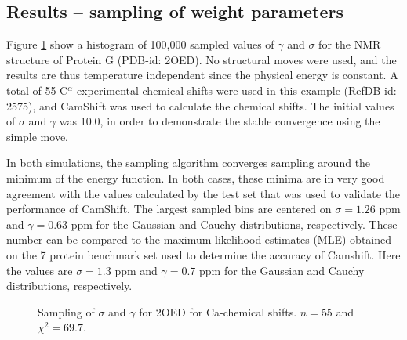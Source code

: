 \subsection{Results -- sampling of weight parameters}
Figure \ref{fig:example} show a histogram of 100,000 sampled values of $\gamma$ and $\sigma$ for the NMR structure of Protein G (PDB-id: 2OED). 
No structural moves were used, and the results are thus temperature independent since the physical energy is constant.
A total of 55 C$^\alpha$ experimental chemical shifts were used in this example (RefDB-id: 2575), and CamShift was used to calculate the chemical shifts. 
The initial values of $\sigma$ and $\gamma$ was 10.0, in order to demonstrate the stable convergence using the simple move.

In both simulations, the sampling algorithm converges sampling around the minimum of the energy function.
In both cases, these minima are in very good agreement with the values calculated by the test set that was used to validate the performance of CamShift.
The largest sampled bins are centered on $\sigma = 1.26$ ppm and $\gamma = 0.63$ ppm for the Gaussian and Cauchy distributions, respectively.
These number can be compared to the maximum likelihood estimates (MLE) obtained on the 7 protein benchmark set used to determine the accuracy of Camshift.
Here the values are $\sigma = 1.3$ ppm and $\gamma = 0.7$ ppm for the Gaussian and Cauchy distributions, respectively.


\begin{figure}%
    \centering
    \qquad
    \caption{Sampling of $\sigma$ and $\gamma$ for 2OED for Ca-chemical shifts. $n = 55$ and $\chi^2 = 69.7$.}
    \label{fig:example}%
\end{figure}

